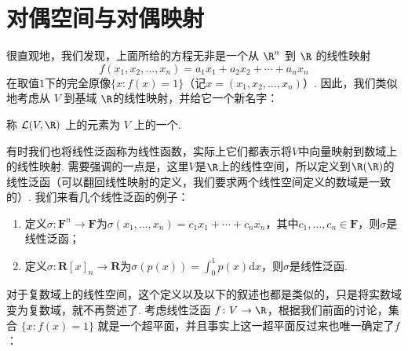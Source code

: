 





\section{对偶空间与对偶映射}

很直观地，我们发现，上面所给的方程无非是一个从 $\R^n$ 到 $\R$ 的线性映射
\[f(x_1, x_2, \ldots, x_n) = a_1 x_1 + a_2 x_2 + \cdots + a_n x_n\]
在取值$1$下的完全原像$\{x: f(x) = 1\}$（记$x=(x_1,x_2,\ldots,x_n)$）. 因此，我们类似地考虑从 $V$ 到基域 $\R$的线性映射，并给它一个新名字：

\begin{definition}{}{}
    称 $\mathcal{L}(V, \R)$ 上的元素为 $V$ 上的一个.
\end{definition}
有时我们也将线性泛函称为线性函数，实际上它们都表示将$V$中向量映射到数域上的线性映射. 需要强调的一点是，这里$V$是$\R$上的线性空间，所以定义到$\R(\R)$的线性泛函（可以翻回线性映射的定义，我们要求两个线性空间定义的数域是一致的）. 我们来看几个线性泛函的例子：
\begin{enumerate}
    \item 定义$\sigma:\mathbf{F}^n\to\mathbf{F}$为$\sigma(x_1,\ldots,x_n)=c_1x_1+\cdots+c_nx_n$，其中$c_1,\ldots,c_n\in\mathbf{F}$，则$\sigma$是线性泛函；

    \item 定义$\sigma:\mathbf{R}[x]_n\to\mathbf{R}$为$\sigma(p(x))=\displaystyle\int_0^1p(x)\mathrm{d}x$，则$\sigma$是线性泛函.
\end{enumerate}

对于复数域上的线性空间，这个定义以及以下的叙述也都是类似的，只是将实数域变为复数域，就不再赘述了. 考虑线性泛函 $f\colon V \to \R$，根据我们前面的讨论，集合 $\{x: f(x) = 1\}$ 就是一个超平面，并且事实上这一超平面反过来也唯一确定了$f$：

